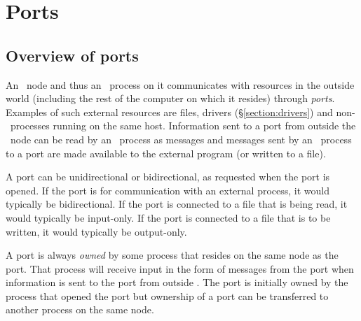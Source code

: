 %
%
%
%
%
%
%

\chapter{Ports}

\label{chapter:more-about-ports}

\section{Overview of ports}


An \Erlang\ node and thus an \Erlang\ process on it communicates with
resources in the outside world (including the rest of the computer on
which it resides) through \emph{ports}.  Examples of such external
resources are files, drivers (\S\ref{section:drivers}) and non-\Erlang\
processes running on the same
host.  Information sent to a port from outside the \Erlang\ node
can be read by an \Erlang\ process as messages and
messages sent by an \Erlang\ process to a port are made available to
the external program (or written to a file).

A port can be unidirectional or bidirectional, as requested when the port
is opened.  If the port is for communication
with an external process, it would typically be bidirectional.
\ifOld
If the port is connected to a file that is being read, it would typically
be input-only.  If the port is connected to a file that is to be written,
it would typically be output-only.
\fi
{}

A port is always \emph{owned} by some process that resides on the
same node as the port.
That process will receive input in the form of messages from the
port when information is sent to the port from outside \Erlang.
The port is initially owned by the process that opened the port but ownership
of a port can be transferred to another process on the same node.
\index{port!ownership|)}

